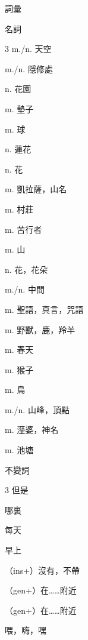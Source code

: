 \documentclass[aspectratio=169]{beamer}
\begin{document}
\begin{frame}{詞彙}
    \begin{block}{名詞}
        \begin{VocabCols}{3}
             m./n. 天空
            
             m./n. 隱修處
            
             n. 花園
            
             m. 墊子
            
             m. 球
            
             n. 蓮花
            
             n. 花
            
             m. 凱拉薩，山名
            
             m. 村莊
            
             m. 苦行者
            
             m. 山
            
             n. 花，花朵
            
             m./n. 中間
            
             m. 聖語，真言，咒語
            
             m. 野獸，鹿，羚羊
            
             m. 春天
            
             m. 猴子
            
             m. 鳥
            
             m./n. 山峰，頂點
            
             m. 溼婆，神名
            
             m. 池塘
        \end{VocabCols}
    \end{block}

    \begin{block}{不變詞}
        \begin{VocabCols}{3}
             但是
            
             哪裏
            
             每天
            
             早上
            
             （ins+）沒有，不帶
            
             （gen+）在……附近
            
             （gen+）在……附近
            
             喂，嗨，嘿
        \end{VocabCols}
    \end{block}
\end{frame}
\end{document}

